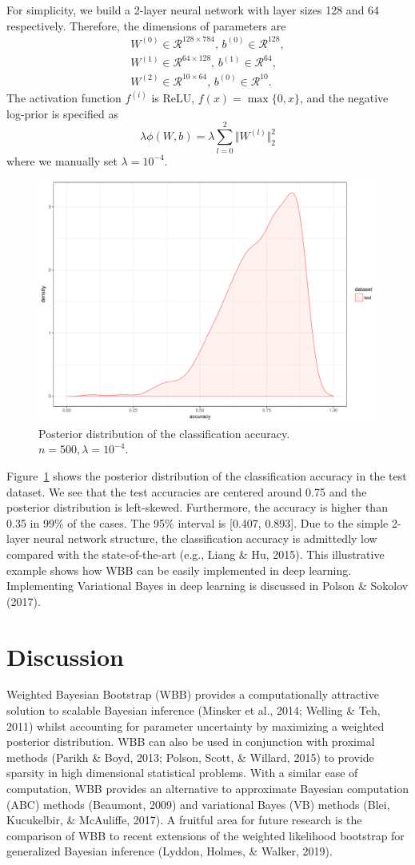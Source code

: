 \documentclass[12pt]{TD-CJS}
\newcommand{\R}{\mathcal{R}}
\begin{document}
For simplicity, we build a 2-layer neural network with layer sizes 128 and 64 respectively. Therefore, the dimensions of parameters are
\begin{align*}
W^{(0)} \in \R^{128\times 784},\, b^{(0)}\in \R^{128},\\
W^{(1)} \in \R^{64\times 128},\, b^{(1)}\in \R^{64},\\
W^{(2)} \in \R^{10\times 64},\, b^{(0)}\in \R^{10}.
\end{align*}
The activation function $f^{(i)}$ is ReLU, $f(x) = \max\{0,x\}$, and the negative log-prior is specified as 
$$
\lambda\phi(W,b) = \lambda\sum_{l=0}^{2}\Vert W^{(l)} \Vert_2^2
$$
where we manually set $\lambda = 10^{-4}$. 
\begin{figure}[!ht]
	\centering
	\includegraphics[width=0.7\linewidth]{acc}
	\caption{Posterior distribution of the classification accuracy. $n=500, \lambda=10^{-4}$.}
	\label{fig:acc}
\end{figure}
Figure~\ref{fig:acc} shows the posterior distribution of the classification accuracy in the test dataset. We see that the test accuracies are centered around 0.75 and the posterior distribution is left-skewed. Furthermore, the accuracy is higher than 0.35 in 99\% of the cases. The 95\% interval is [0.407, 0.893].  Due to the simple 2-layer neural network structure, the classification accuracy is admittedly low compared with the state-of-the-art (e.g., Liang \& Hu,  2015). This illustrative example shows how WBB can be easily implemented in deep learning. Implementing Variational Bayes in deep learning is discussed in Polson \& Sokolov (2017).

\section{Discussion}
Weighted Bayesian Bootstrap (WBB) provides a computationally attractive solution to scalable Bayesian inference (Minsker  et al., 2014; Welling \& Teh, 2011)
whilst accounting for parameter uncertainty by maximizing a weighted posterior distribution. WBB can also be used in conjunction with proximal methods (Parikh \& Boyd, 2013; Polson, Scott, \& Willard,  2015)
to provide  sparsity in high dimensional statistical problems. With a similar ease of computation, WBB provides an alternative to approximate Bayesian computation (ABC)
 methods (Beaumont, 2009) and variational Bayes (VB) methods (Blei, Kucukelbir, \& McAuliffe,  2017). A fruitful area for future research is the comparison of WBB to recent extensions of 
the weighted likelihood bootstrap for generalized Bayesian inference 
(Lyddon, Holmes, \& Walker, 2019).
\end{document}
